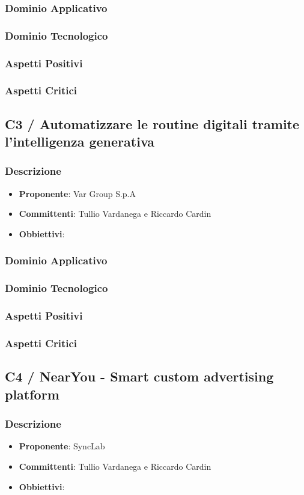 \documentclass[a4paper, 12pt]{article}
\begin{document}
\subsubsection{Dominio Applicativo}
\subsubsection{Dominio Tecnologico}
\subsubsection{Aspetti Positivi}
\subsubsection{Aspetti Critici}
\subsection{C3 / Automatizzare le routine digitali tramite l’intelligenza generativa}
\subsubsection{Descrizione}
\begin{itemize}
    \item \textbf{Proponente}: Var Group S.p.A
    \item \textbf{Committenti}: Tullio Vardanega e Riccardo Cardin
    \item \textbf{Obbiettivi}: 
\end{itemize}
\subsubsection{Dominio Applicativo}
\subsubsection{Dominio Tecnologico}
\subsubsection{Aspetti Positivi}
\subsubsection{Aspetti Critici}
\subsection{C4 / NearYou - Smart custom advertising platform}
\subsubsection{Descrizione}
\begin{itemize}
    \item \textbf{Proponente}: SyncLab 
    \item \textbf{Committenti}: Tullio Vardanega e Riccardo Cardin
    \item \textbf{Obbiettivi}: 
\end{itemize}
\end{document}
